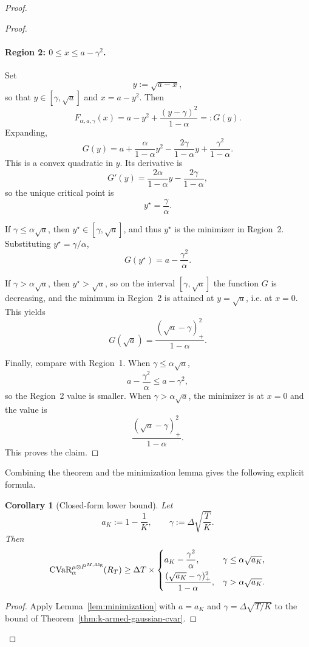\documentclass[conference]{IEEEtran}
\newtheorem{corollary}{Corollary}
\begin{document}
\begin{proof}[Proof]
\begin{proof}
\paragraph{Region 2: $0\le x\le a-\gamma^2$.}
Set
\[
y:=\sqrt{a-x},
\]
so that $y\in[\gamma,\sqrt a]$ and $x=a-y^2$.
Then
\[
F_{\alpha,a,\gamma}(x)
=
a-y^2+\frac{(y-\gamma)^2}{1-\alpha}
=:G(y).
\]
Expanding,
\[
G(y)
=
a+\frac{\alpha}{1-\alpha}y^2-\frac{2\gamma}{1-\alpha}y+\frac{\gamma^2}{1-\alpha}.
\]
This is a convex quadratic in $y$.
Its derivative is
\[
G'(y)=\frac{2\alpha}{1-\alpha}y-\frac{2\gamma}{1-\alpha},
\]
so the unique critical point is
\[
y^\star=\frac{\gamma}{\alpha}.
\]

If $\gamma\le \alpha\sqrt a$, then $y^\star\in[\gamma,\sqrt a]$, and thus $y^\star$ is the minimizer in Region~2.
Substituting $y^\star=\gamma/\alpha$,
\[
G(y^\star)=a-\frac{\gamma^2}{\alpha}.
\]

If $\gamma>\alpha\sqrt a$, then $y^\star>\sqrt a$, so on the interval $[\gamma,\sqrt a]$ the function $G$ is decreasing, and the minimum in Region~2 is attained at $y=\sqrt a$, i.e. at $x=0$.
This yields
\[
G(\sqrt a)=\frac{(\sqrt a-\gamma)_+^2}{1-\alpha}.
\]

Finally, compare with Region~1.
When $\gamma\le \alpha\sqrt a$,
\[
a-\frac{\gamma^2}{\alpha}\le a-\gamma^2,
\]
so the Region~2 value is smaller.
When $\gamma>\alpha\sqrt a$, the minimizer is at $x=0$ and the value is
\[
\frac{(\sqrt a-\gamma)_+^2}{1-\alpha}.
\]
This proves the claim.
\end{proof}

Combining the theorem and the minimization lemma gives the following explicit formula.

\begin{corollary}[Closed-form lower bound]
\label{cor:closed-form}
Let
\[
a_K:=1-\frac1K,
\qquad
\gamma:=\Delta\sqrt{\frac{T}{K}}.
\]
Then
\[
\textup{CVaR}_\alpha^{\mu\otimes P^{M,\textup{Alg}}}(R_T)
\ge
\Delta T \times
\begin{cases}
a_K-\dfrac{\gamma^2}{\alpha}, & \gamma\le \alpha\sqrt{a_K},\\[1.5ex]
\dfrac{(\sqrt{a_K}-\gamma)_+^2}{1-\alpha}, & \gamma>\alpha\sqrt{a_K}.
\end{cases}
\]
\end{corollary}

\begin{proof}
Apply Lemma~\ref{lem:minimization} with $a=a_K$ and $\gamma=\Delta\sqrt{T/K}$ to the bound of Theorem~\ref{thm:k-armed-gaussian-cvar}.
\end{proof}


\end{proof}
\end{document}
